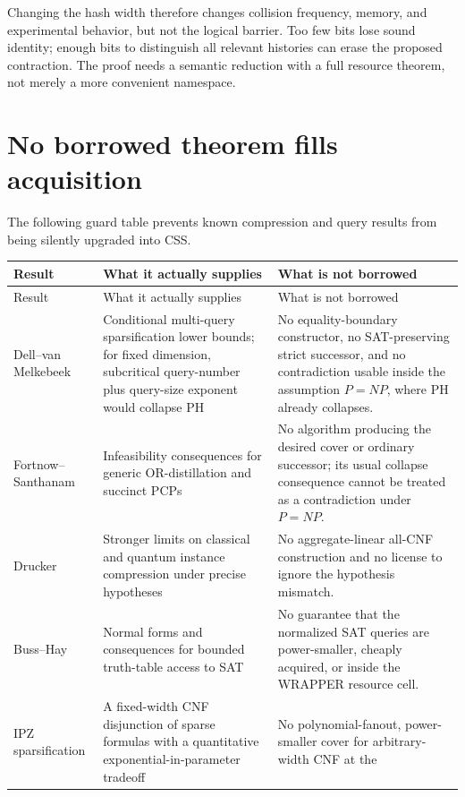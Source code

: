 \documentclass[11pt]{article}
\begin{document}
Changing the hash width therefore changes collision frequency, memory, and
experimental behavior, but not the logical barrier.  Too few bits lose
sound identity; enough bits to distinguish all relevant histories can erase
the proposed contraction.  The proof needs a semantic reduction with a full
resource theorem, not merely a more convenient namespace.

\section{No borrowed theorem fills acquisition}

The following guard table prevents known compression and query results from
being silently upgraded into CSS.

\begin{longtable}{L{0.22\textwidth}L{0.31\textwidth}L{0.39\textwidth}}
\toprule
Result & What it actually supplies & What is not borrowed \\
\midrule
\endfirsthead
\toprule
Result & What it actually supplies & What is not borrowed \\
\midrule
\endhead
\bottomrule
\endfoot
Dell--van Melkebeek & Conditional multi-query sparsification lower bounds;
for fixed dimension, subcritical query-number plus query-size exponent would
collapse PH \cite{dellvanmelkebeek2014} & No equality-boundary constructor,
no SAT-preserving strict successor, and no contradiction usable inside the
assumption $P=NP$, where PH already collapses. \\
Fortnow--Santhanam & Infeasibility consequences for generic OR-distillation
and succinct PCPs \cite{fortnowsanthanam2011} & No algorithm producing the
desired cover or ordinary successor; its usual collapse consequence cannot
be treated as a contradiction under $P=NP$. \\
Drucker & Stronger limits on classical and quantum instance compression under
precise hypotheses \cite{drucker2015} & No aggregate-linear all-CNF
construction and no license to ignore the hypothesis mismatch. \\
Buss--Hay & Normal forms and consequences for bounded truth-table access to
SAT \cite{busshay1991} & No guarantee that the normalized SAT queries are
power-smaller, cheaply acquired, or inside the WRAPPER resource cell. \\
IPZ sparsification & A fixed-width CNF disjunction of sparse formulas with a
quantitative exponential-in-parameter tradeoff \cite{ipz2001,calabro2010} &
No polynomial-fanout, power-smaller cover for arbitrary-width CNF at the

\end{longtable}
\end{document}
